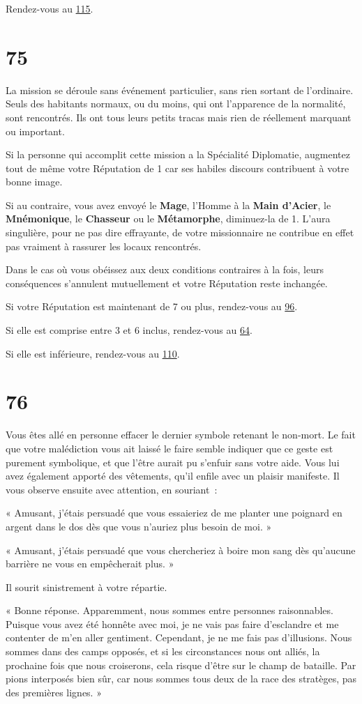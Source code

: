 \documentclass{report}
\newcommand{\gsection}[1]{
    \section{#1}
    \label{section-#1}
}
\newcommand{\glink}[1]{\hyperref[section-#1]{#1}}
\newcommand{\hero}[1]{\textbf{#1}}
\begin{document}
Rendez-vous au \glink{115}.

\gsection{75}

La mission se déroule sans événement particulier, sans rien sortant de l'ordinaire. Seuls des habitants normaux, ou du moins, qui ont l'apparence de la normalité, sont rencontrés. Ils ont tous leurs petits tracas mais rien de réellement marquant ou important.

Si la personne qui accomplit cette mission a la Spécialité Diplomatie, augmentez tout de même votre Réputation de 1 car ses habiles discours contribuent à votre bonne image.

Si au contraire, vous avez envoyé le \hero{Mage}, l'Homme à la \hero{Main d'Acier}, le \hero{Mnémonique}, le \hero{Chasseur} ou le \hero{Métamorphe}, diminuez-la de 1. L'aura singulière, pour ne pas dire effrayante, de votre missionnaire ne contribue en effet pas vraiment à rassurer les locaux rencontrés.

Dans le cas où vous obéissez aux deux conditions contraires à la fois, leurs conséquences s'annulent mutuellement et votre Réputation reste inchangée.

Si votre Réputation est maintenant de 7 ou plus, rendez-vous au \glink{96}.

Si elle est comprise entre 3 et 6 inclus, rendez-vous au \glink{64}.

Si elle est inférieure, rendez-vous au \glink{110}.

\gsection{76}

Vous êtes allé en personne effacer le dernier symbole retenant le non-mort. Le fait que votre malédiction vous ait laissé le faire semble indiquer que ce geste est purement symbolique, et que l'être aurait pu s'enfuir sans votre aide. Vous lui avez également apporté des vêtements, qu'il enfile avec un plaisir manifeste. Il vous observe ensuite avec attention, en souriant :

« Amusant, j'étais persuadé que vous essaieriez de me planter une poignard en argent dans le dos dès que vous n'auriez plus besoin de moi. »

« Amusant, j'étais persuadé que vous chercheriez à boire mon sang dès qu'aucune barrière ne vous en empêcherait plus. »

Il sourit sinistrement à votre répartie.

« Bonne réponse. Apparemment, nous sommes entre personnes raisonnables. Puisque vous avez été honnête avec moi, je ne vais pas faire d'esclandre et me contenter de m'en aller gentiment. Cependant, je ne me fais pas d'illusions. Nous sommes dans des camps opposés, et si les circonstances nous ont alliés, la prochaine fois que nous croiserons, cela risque d'être sur le champ de bataille. Par pions interposés bien sûr, car nous sommes tous deux de la race des stratèges, pas des premières lignes. »
\end{document}
